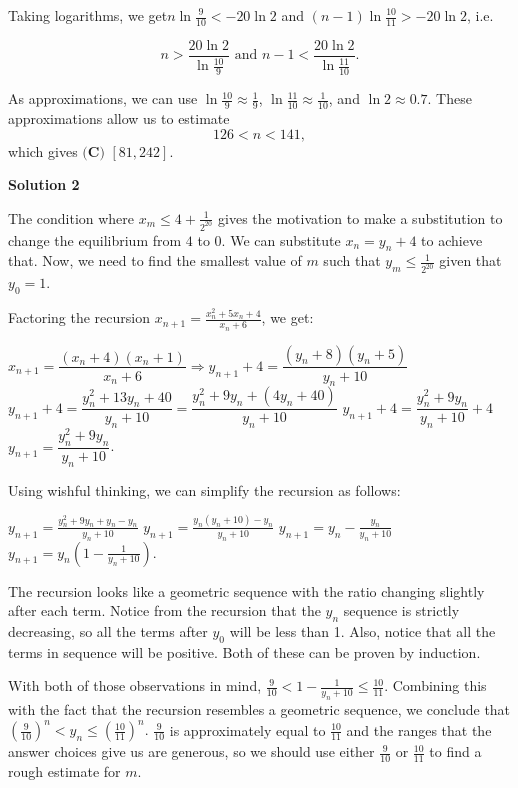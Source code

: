 \begin{enumerate}
 Taking logarithms, we get$n \ln \frac{9}{10} < -20 \ln 2$ and $(n-1)\ln \frac{10}{11} > -20 \ln 2$, i.e.

 
 \[n > \frac{20\ln 2}{\ln\frac{10}{9}} \text{  and  }  n-1 < \frac{20\ln 2}{\ln\frac{11}{10}} .\]

 As approximations, we can use $\ln\frac{10}{9} \approx \frac{1}{9}$, $\ln\frac{11}{10} \approx \frac{1}{10}$, and $\ln 2\approx 0.7$. These approximations allow us to estimate
 \[126 < n < 141,\]which gives $\boxed{\textbf{(C) } [81,242]}$.

 



\textbf{Solution 2}

The condition where $x_m\leq 4+\frac{1}{2^{20}}$ gives the motivation to make a substitution to change the equilibrium from $4$ to $0$. We can substitute $x_n = y_n + 4$ to achieve that. Now, we need to find the smallest value of $m$ such that $y_m\leq \frac{1}{2^{20}}$ given that $y_0 = 1$. 

 


 Factoring the recursion $x_{n+1} = \frac{x_n^2 + 5x_n+4}{x_n + 6}$, we get: 

 $x_{n+1}=\dfrac{(x_n + 4)(x_n + 1)}{x_n + 6} \Rightarrow y_{n+1}+4=\dfrac{(y_n+8)(y_n+5)}{y_n+10}$
$y_{n+1}+4=\dfrac{y_n^2+13y_n+40}{y_n+10} = \dfrac{y_n^2+9y_n +(4y_n+40)}{y_n+10}$
$y_{n+1}+4=\dfrac{y_n^2+9y_n}{y_n+10} + 4$
$y_{n+1}=\dfrac{y_n^2+9y_n}{y_n+10}$.

 


 Using wishful thinking, we can simplify the recursion as follows:

 $y_{n+1} = \frac{y_n^2 + 9y_n + y_n - y_n}{y_n + 10}$
$y_{n+1} = \frac{y_n(y_n + 10) - y_n}{y_n + 10}$
$y_{n+1} = y_n - \frac{y_n}{y_n + 10}$
$y_{n+1} = y_n\left(1 - \frac{1}{y_n + 10}\right)$.

 
The recursion looks like a geometric sequence with the ratio changing slightly after each term. Notice from the recursion that the $y_n$ sequence is strictly decreasing, so all the terms after $y_0$ will be less than 1. Also, notice that all the terms in sequence will be positive. Both of these can be proven by induction.

 
With both of those observations in mind, $\frac{9}{10} < 1 - \frac{1}{y_n + 10} \leq \frac{10}{11}$. Combining this with the fact that the recursion resembles a geometric sequence, we conclude that $\left(\frac{9}{10}\right)^n < y_n \leq \left(\frac{10}{11}\right)^n.$
$\frac{9}{10}$ is approximately equal to $\frac{10}{11}$ and the ranges that the answer choices give us are generous, so we should use either $\frac{9}{10}$ or $\frac{10}{11}$ to find a rough estimate for $m$.


\end{enumerate}
